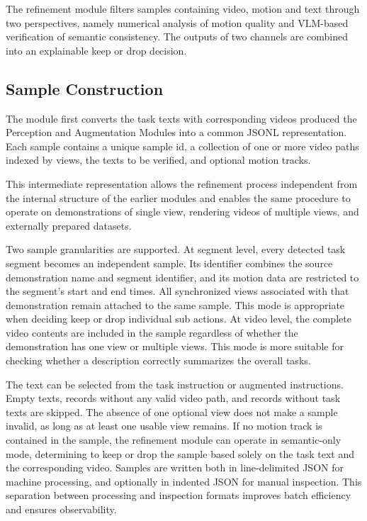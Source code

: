 \documentclass[11pt,oneside]{report}
\begin{document}
The refinement module filters samples containing video, motion and text through two perspectives, namely numerical analysis of motion quality and VLM-based verification of semantic consistency. The outputs of two channels are combined into an explainable keep or drop decision.
\subsection{Sample Construction}

The module first converts the task texts with corresponding videos produced the Perception and Augmentation Modules into a common JSONL representation. Each sample contains a unique sample id, a collection of one or more video paths indexed by views, the texts to be verified, and optional motion tracks.

This intermediate representation allows the refinement process independent from the internal structure of the earlier modules and enables the same procedure to operate on demonstrations of single view, rendering videos of multiple views, and externally prepared datasets.

Two sample granularities are supported. At segment level, every detected task segment becomes an independent sample. Its identifier combines the source demonstration name and segment identifier, and its motion data are restricted to the segment's start and end times. All synchronized views associated with that demonstration remain attached to the same sample. This mode is appropriate when deciding keep or drop individual sub actions. At video level, the complete video contents are included in the sample regardless of whether the demonstration has one view or multiple views. This mode is more suitable for checking whether a description correctly summarizes the overall tasks.

The text can be selected from the task instruction or augmented instructions. Empty texts, records without any valid video path, and records without task texts are skipped. The absence of one optional view does not make a sample invalid, as long as at least one usable view remains. If no motion track is contained in the sample, the refinement module can operate in semantic-only mode, determining to keep or drop the sample based solely on the task text and the corresponding video. Samples are written both in line-delimited JSON for machine processing, and optionally in indented JSON for manual inspection. This separation between processing and inspection formats improves batch efficiency and ensures observability.
\end{document}
